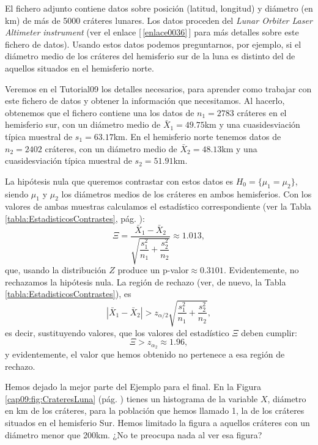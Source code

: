 \begin{ejemplo}
\label{cap09:ejem:CrateresLunares}
El fichero adjunto
 contiene
datos sobre posición (latitud, longitud) y diámetro (en km) de más de 5000 cráteres lunares. Los
datos proceden del {\em Lunar Orbiter Laser Altimeter instrument} (ver el 
enlace [\,\ref{enlace0036}\,]\label{enlace0036a} para más detalles sobre este fichero de datos). Usando estos datos
podemos preguntarnos, por ejemplo, si el diámetro medio de los cráteres del hemisferio sur de la
luna es distinto del de aquellos situados en el hemisferio norte.

Veremos en el Tutorial09 los detalles necesarios, para aprender como trabajar con este fichero de
datos y obtener la información que necesitamos. Al hacerlo, obtenemos que el fichero contiene una
los datos de $n_1=2783$ cráteres en el hemisferio sur, con un diámetro medio de $\bar X_1=49.75$km
y una cuasidesviación típica muestral de $s_1=63.17$km. En el hemisferio norte tenemos datos de
$n_2=2402$ cráteres, con un diámetro medio de $\bar X_2=48.13$km y una cuasidesviación típica
muestral de $s_2=51.91$km.

La hipótesis nula que queremos contrastar con estos datos es $H_0=\{\mu_1=\mu_2\}$, siendo $\mu_1$
y $\mu_2$ los diámetros medios de los cráteres en ambos hemisferios. Con los valores de ambas
muestras calculamos el estadístico correspondiente (ver la Tabla
\ref{tabla:EstadisticosContrastes}, pág. \pageref{tabla:EstadisticosContrastes}):
\[\Xi=\dfrac{\bar X_1-\bar X_2}{\sqrt{\dfrac{s_1^2}{n_1}+\dfrac{s_2^2}{n_2}}}\approx 1.013,\]
que, usando la distribución $Z$ produce un p-valor$\approx 0.3101$. Evidentemente, no rechazamos la hipótesis nula. La región de rechazo (ver, de nuevo, la Tabla \ref{tabla:EstadisticosContrastes}), es
\[|\bar X_1-\bar X_2|>\displaystyle{z_{\alpha/2}}{\sqrt{\frac{s_1^2}{n_1}+\frac{s_2^2}{n_2}}},\]
es decir, sustituyendo valores, que los valores del estadístico $\Xi$ deben cumplir:
\[\Xi>z_{\alpha_2}\approx 1.96,\]
y evidentemente, el valor que hemos obtenido no pertenece a esa región de rechazo.

Hemos dejado la mejor parte del Ejemplo para el final. En la Figura \ref{cap09:fig:CrateresLuna}
(pág. \pageref{cap09:fig:CrateresLuna}) tienes un histograma de la variable $X$, diámetro en km de
los cráteres, para la población que hemos llamado 1, la de los cráteres situados en el hemisferio
Sur. Hemos limitado la figura a aquellos cráteres con un diámetro menor que 200km. ¿No te preocupa
nada al ver esa figura?


\end{ejemplo}
